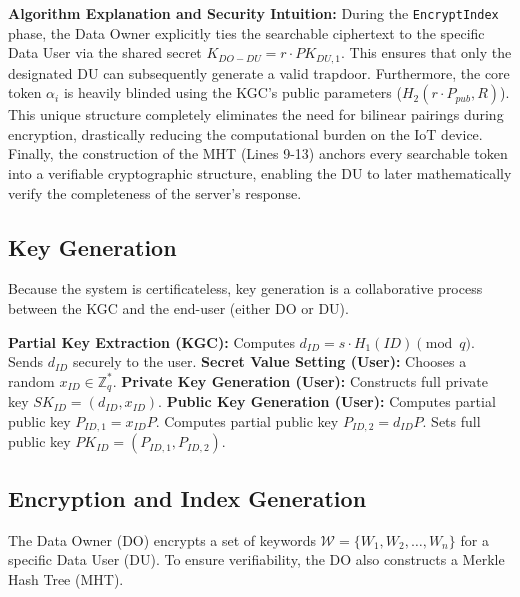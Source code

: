 \documentclass[10pt,journal,compsoc]{IEEEtran}
\begin{document}
\textbf{Algorithm Explanation and Security Intuition:} During the \texttt{EncryptIndex} phase, the Data Owner explicitly ties the searchable ciphertext to the specific Data User via the shared secret $K_{DO-DU} = r \cdot PK_{DU,1}$. This ensures that only the designated DU can subsequently generate a valid trapdoor. Furthermore, the core token $\alpha_i$ is heavily blinded using the KGC's public parameters ($H_2(r \cdot P_{pub}, R)$). This unique structure completely eliminates the need for bilinear pairings during encryption, drastically reducing the computational burden on the IoT device. Finally, the construction of the MHT (Lines 9-13) anchors every searchable token into a verifiable cryptographic structure, enabling the DU to later mathematically verify the completeness of the server's response.

\subsection{Key Generation}
Because the system is certificateless, key generation is a collaborative process between the KGC and the end-user (either DO or DU).

\begin{algorithm}[H]
\caption{KeyGen($ID$, $params$, $s$)}
\begin{algorithmic}[1]
\State \textbf{Partial Key Extraction (KGC):}
\State Computes $d_{ID} = s \cdot H_1(ID) \pmod q$.
\State Sends $d_{ID}$ securely to the user.
\State \textbf{Secret Value Setting (User):}
\State Chooses a random $x_{ID} \in \mathbb{Z}_q^*$.
\State \textbf{Private Key Generation (User):}
\State Constructs full private key $SK_{ID} = (d_{ID}, x_{ID})$.
\State \textbf{Public Key Generation (User):}
\State Computes partial public key $P_{ID,1} = x_{ID}P$.
\State Computes partial public key $P_{ID,2} = d_{ID}P$.
\State Sets full public key $PK_{ID} = (P_{ID,1}, P_{ID,2})$.
\end{algorithmic}
\end{algorithm}

\subsection{Encryption and Index Generation}
The Data Owner (DO) encrypts a set of keywords $\mathcal{W} = \{W_1, W_2, \dots, W_n\}$ for a specific Data User (DU). To ensure verifiability, the DO also constructs a Merkle Hash Tree (MHT).
\end{document}
